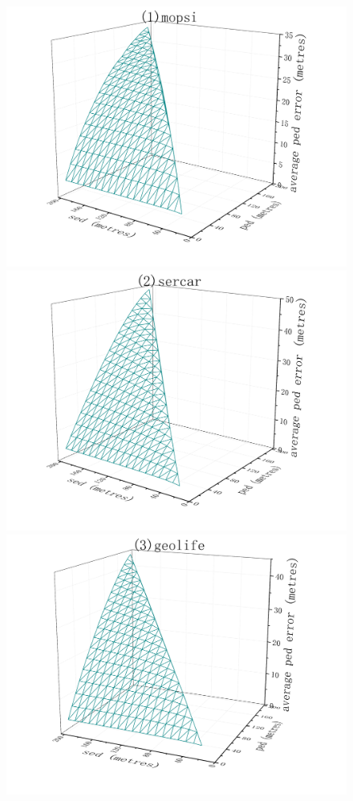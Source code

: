 {\begin{figure}[tb!]
	\centering
	\includegraphics[scale = 0.210]{figures/Fig-BITT-mopsi-ped-error.png}\hspace{1ex}
	\includegraphics[scale = 0.210]{figures/Fig-BITT-sercar-ped-error.png}\hspace{1ex}
	\includegraphics[scale = 0.210]{figures/Fig-BITT-geolife-ped-error.png}\hspace{1ex}

\end{figure}}
